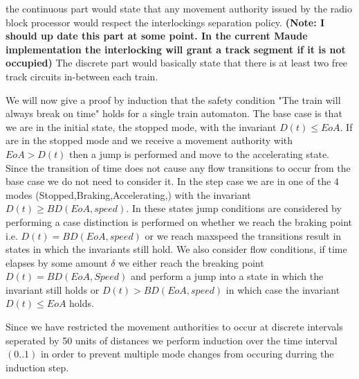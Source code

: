 the continuous part would state that any movement authority issued by the radio block processor would respect the interlockings separation policy. \textbf{(Note: I should up date this part at some point. In the current Maude implementation the interlocking will grant a track segment if it is not occupied)} The discrete part would basically state that there is at least two free track circuits in-between each train.


We will now give a proof by induction that the safety condition "The train will always break on time" holds for a single train automaton.
The base case is that we are in the initial state, the stopped mode, with the invariant $D(t) \leq EoA$. If are in the stopped mode and we receive a movement authority with $EoA > D(t)$ then a jump is performed and move to the accelerating state. Since the transition of time does not cause any flow transitions to occur from the base case we do not need to consider it. In the step case we are in one of the 4 modes (Stopped,Braking,Accelerating,) with the invariant $D(t) \geq BD(EoA,speed)$. In these states jump conditions are considered by performing a case distinction is performed on whether we reach the braking point i.e. $D(t) = BD(EoA, speed)$ or we reach maxspeed the transitions result in states in which the invariants still hold. We also consider flow conditions, if time elapses by some amount $\delta$ we either reach the breaking point $D(t) = BD(EoA,Speed)$ and perform a jump into a state in which the invariant still holds or $D(t) > BD(EoA,speed)$ in which case the invariant $D(t) \leq EoA$ holds. 

Since we have restricted the movement authorities to occur at discrete intervals seperated by 50 units of distances we perform induction over the time interval $(0..1)$ in order to prevent multiple mode changes from occuring durring the induction step. 

